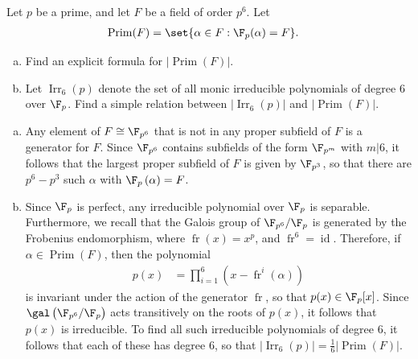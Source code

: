 \documentclass[10pt]{mypackage}
\begin{document}
\begin{problem}[Problem 7]
  Let $p$ be a prime, and let $F$ be a field of order $p^{6}$. Let
  \begin{align*}
    \operatorname{Prim}(F) &= \set{\alpha\in F : \F_p(\alpha) = F}.
  \end{align*}
  \begin{enumerate}[(a)]
    \item Find an explicit formula for $ \left\vert \operatorname{Prim}(F) \right\vert $.
    \item Let $\operatorname{Irr}_{6}(p)$ denote the set of all monic irreducible polynomials of degree $6$ over $\F_p$. Find a simple relation between $ \left\vert \operatorname{Irr}_6(p) \right\vert $ and $\left\vert \operatorname{Prim}(F) \right\vert$.
  \end{enumerate}
\end{problem}
\begin{solution}\hfill
  \begin{enumerate}[(a)]
    \item Any element of $F\cong \F_{p^{6}}$ that is not in any proper subfield of $F$ is a generator for $F$. Since $\F_{p^{6}}$ contains subfields of the form $\F_{p^{m}}$ with $m | 6$, it follows that the largest proper subfield of $F$ is given by $\F_{p^{3}}$, so that there are $p^{6}-p^3$ such $\alpha$ with $\F_p\left( \alpha \right) = F$.
    \item Since $\F_p$ is perfect, any irreducible polynomial over $\F_p$ is separable. Furthermore, we recall that the Galois group of $\F_{p^6}/\F_p$ is generated by the Frobenius endomorphism, where $\operatorname{fr}(x) = x^{p}$, and $\operatorname{fr}^{6} = \operatorname{id}$. Therefore, if $\alpha\in \operatorname{Prim}(F)$, then the polynomial
      \begin{align*}
        p(x) &= \prod_{i=1}^{6} \left( x-\operatorname{fr}^{i}\left( \alpha \right) \right)
      \end{align*}
      is invariant under the action of the generator $\operatorname{fr}$, so that $p(x)\in \F_p[x]$. Since $\gal\left( \F_{p^{6}}/\F_p \right)$ acts transitively on the roots of $p(x)$, it follows that $p(x)$ is irreducible. To find all such irreducible polynomials of degree $6$, it follows that each of these has degree $6$, so that $\left\vert \operatorname{Irr}_6(p) \right\vert = \frac{1}{6} \left\vert \operatorname{Prim}(F) \right\vert$.
  \end{enumerate}
\end{solution}
\end{document}
